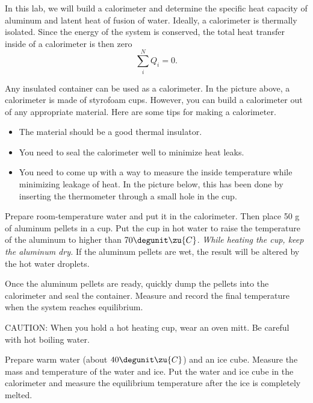 In this lab, we will build a calorimeter and determine the specific
heat capacity of aluminum and latent heat of fusion of water. Ideally,
a calorimeter is thermally isolated. Since the energy of the system is
conserved, the total heat transfer inside of a calorimeter is then zero
\begin{equation*}
\sum_i^N Q_i = 0.
\end{equation*}




\observations 

Any insulated container can be used as a calorimeter. In the picture
above, a calorimeter is made of styrofoam cups.  However, you can
build a calorimeter out of any appropriate material. Here are some tips for making a
calorimeter.

\begin{itemize}
\item The material should be a good thermal insulator.
\item You need to seal the calorimeter well to minimize heat leaks. 
\item You need to come up with a way to measure the inside temperature while minimizing leakage of heat.
In the picture below, this has been done by inserting the thermometer through a small hole in the cup.
\end{itemize}



Prepare room-temperature water and put it in the calorimeter. Then
place 50 g of aluminum pellets in a cup. Put the cup in
hot water to raise the temperature of the aluminum to higher than
$70\degunit\zu{C}$. \textit{While heating the cup, keep the aluminum
dry.} If the aluminum pellets are wet, the result will be altered by
the hot water droplets.

Once the aluminum pellets are ready, quickly dump the pellets into the
calorimeter and seal the container. Measure and record the final
temperature when the system reaches equilibrium.

CAUTION: When you hold a hot heating cup, wear an oven mitt. Be careful with hot boiling water. 

Prepare warm water (about $40\degunit\zu{C}$) and an ice cube. Measure the mass and temperature of the water and ice. Put the water and ice cube in the calorimeter and measure the equilibrium temperature after the ice is completely melted.  

